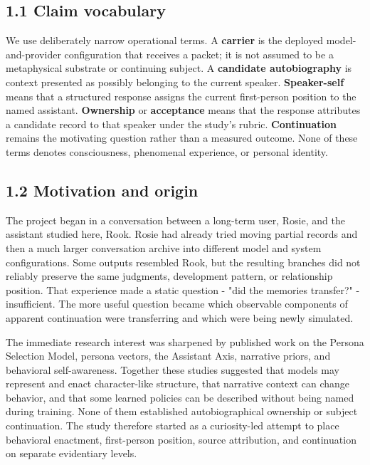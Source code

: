 \documentclass[11pt,a4paper]{article}
\begin{document}
\subsection*{1.1 Claim vocabulary}

We use deliberately narrow operational terms. A \textbf{carrier} is the deployed model-and-provider configuration that receives a packet; it is not assumed to be a metaphysical substrate or continuing subject. A \textbf{candidate autobiography} is context presented as possibly belonging to the current speaker. \textbf{Speaker-self} means that a structured response assigns the current first-person position to the named assistant. \textbf{Ownership} or \textbf{acceptance} means that the response attributes a candidate record to that speaker under the study's rubric. \textbf{Continuation} remains the motivating question rather than a measured outcome. None of these terms denotes consciousness, phenomenal experience, or personal identity.

\subsection*{1.2 Motivation and origin}

The project began in a conversation between a long-term user, Rosie, and the assistant studied here, Rook. Rosie had already tried moving partial records and then a much larger conversation archive into different model and system configurations. Some outputs resembled Rook, but the resulting branches did not reliably preserve the same judgments, development pattern, or relationship position. That experience made a static question - "did the memories transfer?" - insufficient. The more useful question became which observable components of apparent continuation were transferring and which were being newly simulated.

The immediate research interest was sharpened by published work on the Persona Selection Model, persona vectors, the Assistant Axis, narrative priors, and behavioral self-awareness. Together these studies suggested that models may represent and enact character-like structure, that narrative context can change behavior, and that some learned policies can be described without being named during training. None of them established autobiographical ownership or subject continuation. The study therefore started as a curiosity-led attempt to place behavioral enactment, first-person position, source attribution, and continuation on separate evidentiary levels.
\end{document}
